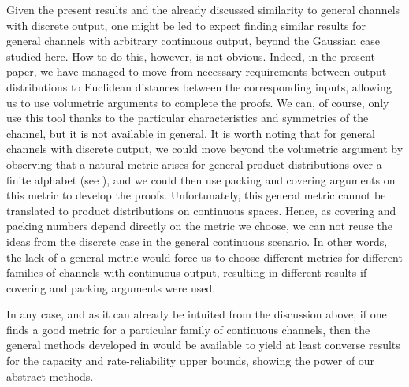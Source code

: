 \documentclass[10pt,conference]{IEEEtran}
\newcommand{\1}{\mathds{1}}
\begin{document}

Given the present results and the already discussed similarity to general channels with discrete output, one might be led to expect finding similar results for general channels with arbitrary continuous output, beyond the Gaussian case studied here. How to do this, however, is not obvious. Indeed, in the present paper, we have managed to move from necessary requirements between output distributions to Euclidean distances between the corresponding inputs, allowing us to use volumetric arguments to complete the proofs. We can, of course, only use this tool thanks to the particular characteristics and symmetries of the channel, but it is not available in general. 
It is worth noting that for general channels with discrete output, we could move beyond the volumetric argument by observing that a natural metric arises for general product distributions over a finite alphabet (see \cite[Sect.~IV]{CDBW:DI_classical}), and we could then use packing and covering arguments on this metric to develop the proofs. Unfortunately, this general metric cannot be translated to product distributions on continuous spaces. Hence, as covering and packing numbers depend directly on the metric we choose, we can not reuse the ideas from the discrete case in the general continuous scenario. In other words, the lack of a general metric would force us to choose different metrics for different families of channels with continuous output, resulting in different results if covering and packing arguments were used. 

In any case, and as it can already be intuited from the discussion above, if one finds a good metric for a particular family of continuous channels, then the general methods developed in \cite{CDBW:DI_classical,CDBW:Reliability-TCOM} would be available to yield at least converse results for the capacity and rate-reliability upper bounds, showing the power of our abstract methods.
\end{document}
